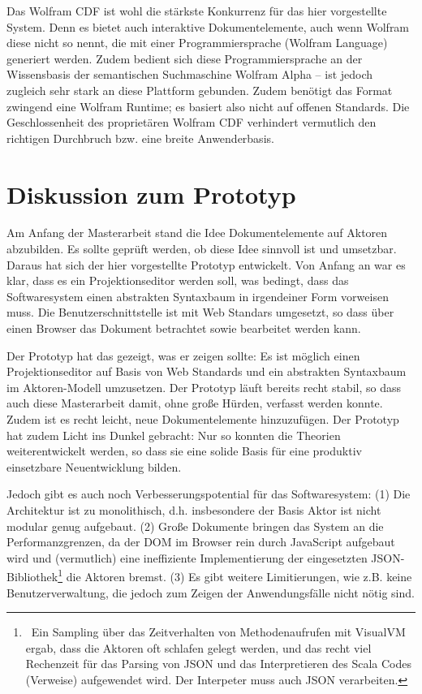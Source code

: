  
Das Wolfram CDF ist wohl die stärkste Konkurrenz für das hier vorgestellte System. Denn es bietet auch interaktive Dokumentelemente, auch wenn Wolfram diese nicht so nennt, die mit einer Programmiersprache (Wolfram Language) generiert werden. Zudem bedient sich diese Programmiersprache an der Wissensbasis der semantischen Suchmaschine Wolfram Alpha -- ist jedoch zugleich sehr stark an diese Plattform gebunden. Zudem benötigt das Format zwingend eine Wolfram Runtime; es basiert also nicht auf offenen Standards. Die Geschlossenheit des proprietären Wolfram CDF verhindert vermutlich den richtigen Durchbruch bzw. eine breite Anwenderbasis.

 
\section{Diskussion zum Prototyp}\label{}
 
Am Anfang der Masterarbeit stand die Idee Dokumentelemente auf Aktoren abzubilden. Es sollte geprüft werden, ob diese Idee sinnvoll ist und umsetzbar. Daraus hat sich der hier vorgestellte Prototyp entwickelt. Von Anfang an war es klar, dass es ein Projektionseditor werden soll, was bedingt, dass das Softwaresystem einen abstrakten Syntaxbaum in irgendeiner Form vorweisen muss. Die Benutzerschnittstelle ist mit Web Standars umgesetzt, so dass über einen Browser das Dokument betrachtet sowie bearbeitet werden kann.

 
Der Prototyp hat das gezeigt, was er zeigen sollte: Es ist möglich einen Projektionseditor auf Basis von Web Standards und ein abstrakten Syntaxbaum im Aktoren-Modell umzusetzen. Der Prototyp läuft bereits recht stabil, so dass auch diese Masterarbeit damit, ohne große Hürden, verfasst werden konnte. Zudem ist es recht leicht, neue Dokumentelemente hinzuzufügen. Der Prototyp hat zudem Licht ins Dunkel gebracht: Nur so konnten die Theorien weiterentwickelt werden, so dass sie eine solide Basis für eine produktiv einsetzbare Neuentwicklung bilden.

 
Jedoch gibt es auch noch Verbesserungspotential für das Softwaresystem: (1) Die Architektur ist zu monolithisch, d.h. insbesondere der Basis Aktor ist nicht modular genug aufgebaut. (2) Große Dokumente bringen das System an die Performanzgrenzen, da der DOM im Browser rein durch JavaScript aufgebaut wird und (vermutlich) eine ineffiziente Implementierung der eingesetzten JSON-Bibliothek\footnote{~Ein Sampling über das Zeitverhalten von Methodenaufrufen mit VisualVM ergab, dass die Aktoren oft schlafen gelegt werden, und das recht viel Rechenzeit für das Parsing von JSON und das Interpretieren des Scala Codes (Verweise) aufgewendet wird. Der Interpeter muss auch JSON verarbeiten.} die Aktoren bremst. (3) Es gibt weitere Limitierungen, wie z.B. keine Benutzerverwaltung, die jedoch zum Zeigen der Anwendungsfälle nicht nötig sind.

